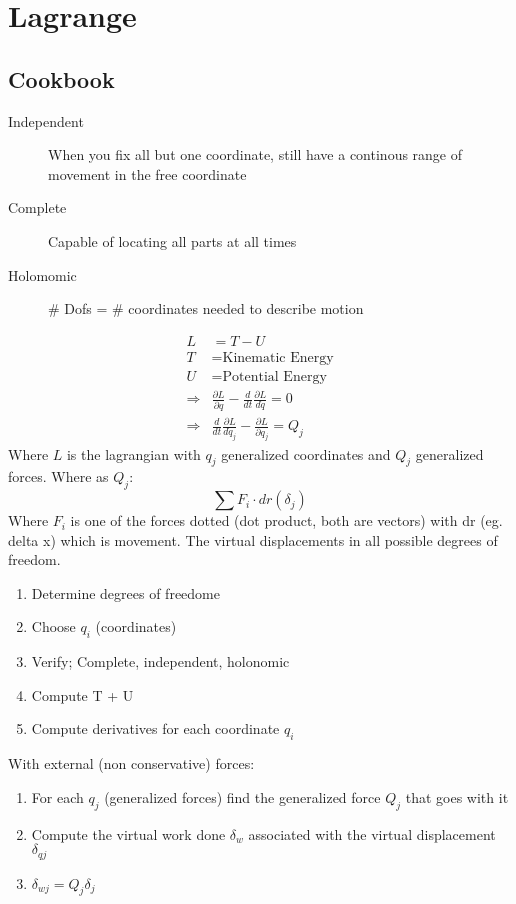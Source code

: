 \documentclass[../Main.tex]{subfiles}
\begin{document}
\chapter{Lagrange}

\intro{

}

\section{Cookbook}
\begin{description}
    \item[Independent] When you fix all but one coordinate, still have a continous range of movement in the free coordinate
    \item[Complete] Capable of locating all parts at all times
    \item[Holomomic] \# Dofs = \# coordinates needed to describe motion
\end{description}

\begin{equation}
    \begin{split}
        L &= T - U \\
        T &= \text{Kinematic Energy} \\
        U &= \text{Potential Energy} \\
        \Rightarrow &\frac{\partial L}{\partial q} - \frac{d}{dt} \frac{\partial L}{d \dot{q}} = 0 \\
        \Rightarrow &\frac{d}{dt} \frac{\partial L}{d \dot{q}_j} - \frac{\partial L}{\partial q_j} = Q_j
    \end{split}
\end{equation}
Where \(L\) is the lagrangian with \(q_j\) generalized coordinates and \(Q_j\) generalized forces.
Where as \(Q_j\):
\begin{equation}
    \sum F_i \cdot d r(\delta_j)
\end{equation}
Where \(F_i\) is one of the forces dotted (dot product, both are vectors) with dr (eg. delta x) which is movement.
The virtual displacements in all possible degrees of freedom.

\begin{enumerate}
    \item Determine degrees of freedome
    \item Choose \(q_i\) (coordinates)
    \item Verify; Complete, independent, holonomic
    \item Compute T + U
    \item Compute derivatives for each coordinate \(q_i\) 
\end{enumerate}

With external (non conservative) forces:
\begin{enumerate}
    \item For each \(q_j\) (generalized forces) find the generalized force
    \(Q_j\) that goes with it
    \item Compute the virtual work done \(\delta_w\) associated with
    the virtual displacement \(\delta_{qj}\)
    \item  \(\delta_{wj} = Q_j \delta_j\)
\end{enumerate}
\end{document}
